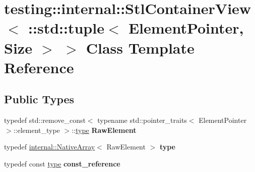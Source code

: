\hypertarget{classtesting_1_1internal_1_1StlContainerView_3_01_1_1std_1_1tuple_3_01ElementPointer_00_01Size_01_4_01_4}{}\section{testing\+:\+:internal\+:\+:Stl\+Container\+View$<$ \+:\+:std\+:\+:tuple$<$ Element\+Pointer, Size $>$ $>$ Class Template Reference}
\label{classtesting_1_1internal_1_1StlContainerView_3_01_1_1std_1_1tuple_3_01ElementPointer_00_01Size_01_4_01_4}
\subsection*{Public Types}
\begin{DoxyCompactItemize}
\item 
\mbox{\label{classtesting_1_1internal_1_1StlContainerView_3_01_1_1std_1_1tuple_3_01ElementPointer_00_01Size_01_4_01_4_acc8b9b701467fad8f16310264cab3bee}} 
typedef std\+::remove\+\_\+const$<$ typename std\+::pointer\+\_\+traits$<$ Element\+Pointer $>$\+::element\+\_\+type $>$\+::\mbox{\hyperlink{classtesting_1_1internal_1_1NativeArray}{type}} {\bfseries Raw\+Element}
\item 
\mbox{\label{classtesting_1_1internal_1_1StlContainerView_3_01_1_1std_1_1tuple_3_01ElementPointer_00_01Size_01_4_01_4_aaa0289cd65ef99ea632d2fb0ad5480eb}} 
typedef \mbox{\hyperlink{classtesting_1_1internal_1_1NativeArray}{internal\+::\+Native\+Array}}$<$ Raw\+Element $>$ {\bfseries type}
\item 
\mbox{\label{classtesting_1_1internal_1_1StlContainerView_3_01_1_1std_1_1tuple_3_01ElementPointer_00_01Size_01_4_01_4_a0c2c9116c784cce6554d4aac9910482b}} 
typedef const \mbox{\hyperlink{classtesting_1_1internal_1_1NativeArray}{type}} {\bfseries const\+\_\+reference}
\end{DoxyCompactItemize}
